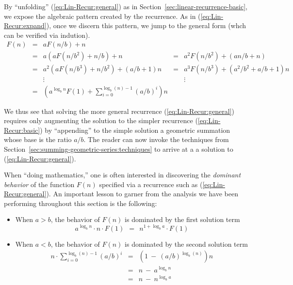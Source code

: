 By ``unfolding'' (\ref{eq:Lin-Recur:general}) as in
Section~\ref{sec:linear-recurrence-basic}, we expose the algebraic
pattern created by the recurrence.  As in (\ref{eq:Lin-Recur:expand}),
once we discern this pattern, we jump to the general form (whch can be
verified via indution).
\[
\begin{array}{ccccc}
F(n) & = & a F(n/b) + n & & \\
     & = & a \left( a F(n/b^2) + n/b \right) + n
             & = & a^2 F(n/b^2) + (an/b+n) \\
     & = & a^2 \left( a F(n/b^3) + n/b^2 \right) + (a/b+1)n
             & = & a^3 F(n/b^3) + (a^2/b^2+a/b+1)n \\
     &   & \vdots & & \vdots \\
    & = & 
{\displaystyle
\left(a^{\log_b n} F(1) + \sum_{i=0}^{\log_b (n)-1} (a/b)^i \right) n
} & &
\end{array}
\]

We thus see that solving the more general recurrence
(\ref{eq:Lin-Recur:general}) requires only augmenting the solution to
the simpler recurrence (\ref{eq:Lin-Recur:basic}) by ``appending'' to
the simple solution a geometric summation whose base is the ratio
$a/b$.  The reader can now invoke the techniques from
Section~\ref{sec:summing-geometric-series:techniques} to arrive at a a
solution to (\ref{eq:Lin-Recur:general}).

When ``doing mathematics,'' one is often interested in discovering the
{\em dominant behavior} of the function $F(n)$ specified via a
recurrence such as (\ref{eq:Lin-Recur:general}).  An important lesson
to garner from the analysis we have been performing throughout this
section is the following:
\begin{itemize}
\item
When $a > b$, the behavior of $F(n)$ is dominated by the first
solution term
\[ a^{\log_b n} \cdot n \cdot  F(1) \ \ = \ \ n^{1 + \log_b a} \cdot F(1) \]
\item
When $a < b$, the behavior of $F(n)$ is dominated by the second
solution term
\begin{eqnarray*}
n \cdot \sum_{i=0}^{\log_b (n)-1} (a/b)^i
  & = &
\left( 1 \ - \  (a/b)^{\log_b (n)} \right) n \\
  & = &
n \ - \ a^{\log_b n} \\
  & = &
n \ - \ n^{\log_b a}
\end{eqnarray*}
\end{itemize}

